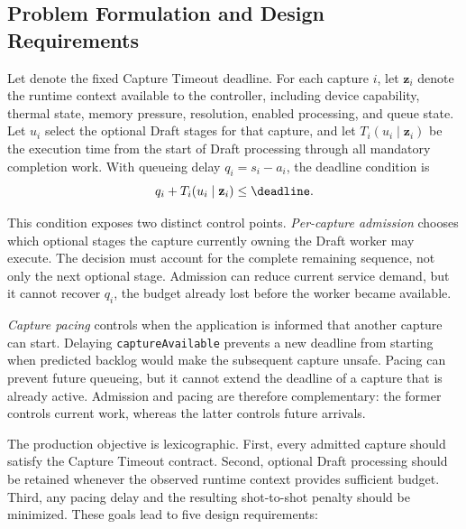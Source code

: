\subsection{Problem Formulation and Design Requirements}
\label{sec:control-problem}

Let \deadline{} denote the fixed Capture Timeout deadline.
For each capture $i$, let $\mathbf{z}_i$ denote the runtime context available to the controller, including device capability, thermal state, memory pressure, resolution, enabled processing, and queue state.
Let $u_i$ select the optional Draft stages for that capture, and let $T_i(u_i\mid\mathbf{z}_i)$ be the execution time from the start of Draft processing through all mandatory completion work.
With queueing delay $q_i=s_i-a_i$, the deadline condition is
\begin{equation}
q_i + T_i(u_i\mid\mathbf{z}_i) \leq \deadline.
\label{eq:control-objective}
\end{equation}

This condition exposes two distinct control points.
\emph{Per-capture admission} chooses which optional stages the capture currently owning the Draft worker may execute.
The decision must account for the complete remaining sequence, not only the next optional stage.
Admission can reduce current service demand, but it cannot recover $q_i$, the budget already lost before the worker became available.

\emph{Capture pacing} controls when the application is informed that another capture can start.
Delaying \texttt{captureAvailable} prevents a new deadline from starting when predicted backlog would make the subsequent capture unsafe.
Pacing can prevent future queueing, but it cannot extend the deadline of a capture that is already active.
Admission and pacing are therefore complementary: the former controls current work, whereas the latter controls future arrivals.

The production objective is lexicographic.
First, every admitted capture should satisfy the Capture Timeout contract.
Second, optional Draft processing should be retained whenever the observed runtime context provides sufficient budget.
Third, any pacing delay and the resulting shot-to-shot penalty should be minimized.
These goals lead to five design requirements:

